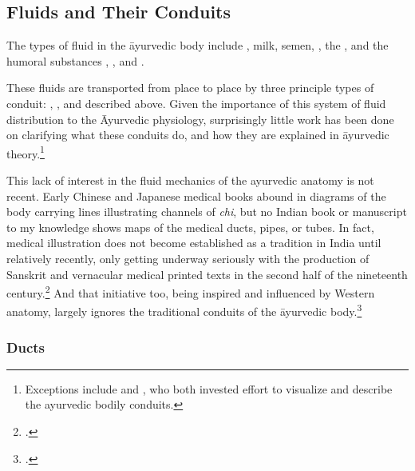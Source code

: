 \begin{refsection}
\subsection{Fluids and Their Conduits}

The types of fluid in the āyurvedic body include ,
milk, semen, , the , and the humoral substances , ,
and .



These fluids are transported from place to place by three principle
types of conduit: , , and
 described above. Given the importance of this
system of fluid distribution to the Āyurvedic physiology, surprisingly
little work has been done on clarifying what these conduits do, and
how they are explained in āyurvedic theory.\footnote{Exceptions
    include \citet[ii.13]{dasg-hist} and \citet[ch.\,2]{kutu-1962}, who
    both invested effort to visualize and describe the ayurvedic bodily
    conduits.}

This lack of interest in the fluid mechanics of the ayurvedic anatomy
is not recent.  Early Chinese and Japanese medical books abound in
diagrams of the body carrying lines illustrating channels of
\emph{chi}, but no Indian book or manuscript to my knowledge shows
maps of the medical ducts, pipes, or tubes.  In fact, medical
illustration does not become established as a tradition in India until
relatively recently, only getting underway seriously with the
production of Sanskrit and vernacular medical printed texts in the
second half of the nineteenth century.\footcite{wuja-2008a}  And that
initiative too, being inspired and influenced by Western anatomy,
largely ignores the traditional conduits of the āyurvedic
body.\footnote{\cite{birc-2024,lust-2018}.}

\subsubsection{Ducts}


\end{refsection}
